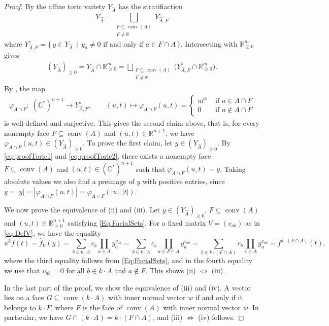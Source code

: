 \documentclass[a4paper,11pt]{amsart}
\theoremstyle{definition}
\DeclareMathOperator{\conv}{conv}
\newcommand{\RR}{\mathbb{R}}
\newcommand{\CC}{\mathbb{C}}
\begin{document}
\begin{proof}
By \cite[Corollary 4.1.3]{TelenBook} the affine toric variety $Y_{\hat{A}}$ has the stratifiaction
\[ Y_{\hat{A}} = \bigsqcup_{\substack{F \subseteq \conv(A)\\ F \neq \emptyset}} Y_{\hat{A},F}^\circ\]
where $Y_{\hat{A},F}^\circ = \{\, y \in Y_{\hat{A}} \, \mid \, y_a \neq 0 \text{ if and only if }  a \in F \cap A\,\}$. Intersecting with $\RR^m_{\geq0}$ gives
\begin{align}
\label{eq:proofToric1}
  ( Y_{\hat{A}})_{\geq 0} =  Y_{\hat{A}} \cap  \RR^m_{\geq0}  = \bigsqcup_{\substack{F \subseteq \conv(A)\\ F \neq \emptyset}} 
 \Big( Y_{\hat{A},F}^\circ  \cap  \RR^m_{\geq0} \big).
 \end{align}
By \cite[Proposition 4.1.5]{TelenBook}, the map
\begin{align}
\label{eq:proofToric2} \varphi_{A \cap F} \colon \; (\CC^*)^{n+1} \to Y_{\hat{A},F}^\circ, \qquad (u,t) \mapsto  \varphi_{A \cap F}(u,t) =  \begin{cases}
    u t^{a} & \text{ if } a \in A\cap F \\
    0  & \text{ if } a \notin A\cap F 
\end{cases} 
\end{align}
is well-defined and surjective. This gives the second claim above, that is, for every nonempty face $F \subseteq \conv(A)$ and $(u,t) \in \RR^{n+1}$, we have $\varphi_{A\cap F}(u,t) \in (Y_{\hat{A}})_{\geq 0}$.
To prove the first claim, let $y \in (Y_{\hat{A}})_{\geq 0}$. By \eqref{eq:proofToric1} and \eqref{eq:proofToric2}, there exists a nonempty face $F\subseteq \conv(A)$ and $(u,t) \in (\CC^*)^{n+1}$ such that $\varphi_{A \cap F} (u,t) = y$. Taking absolute values we also find a preimage of $y$ with positive entries, since  $y = |y| = |\varphi_{A \cap F} (u,t)| = \varphi_{A \cap F} (|u|,|t|)$.

We now prove the equivalence of  (ii) and (iii).
Let $y \in (Y_{\hat{A}})_{\geq 0}, \, F \subseteq \conv(A)$ and $(u,t) \in \RR^{n+1}_{\geq 0}$ satisfying \eqref{Eq:FacialSets}.
For a fixed matrix $V = (v_{ab})$ as in \eqref{eq:DefV}, we have the equality
\[
    u^kf(t) = \hat{f}_V(y) = \sum_{b \in k\cdot A} c_b \prod_{a \in A} y_a^{v_{a b}} = \sum_{ {b \in k\cdot A}} c_b \prod_{a \in F \cap A} y_a^{v_{a b}} = \sum_{b \in k\cdot(F \cap A) } c_b \prod_{a \in A} y_a^{v_{a b}} = f^{k\cdot(F \cap A)}(t),
\]
where the third equality follows from \eqref{Eq:FacialSets}, and in the fourth equality we use that $v_{ab} = 0$ for all $b\in k \cdot A$ and $a \notin F$.
This shows (ii) $\Leftrightarrow$ (iii).

In the last part of the proof, we show the equivalence of (iii) and (iv). A vector lies on a face $G \subseteq\conv(k\cdot A)$ with inner normal vector $w$ if and only if it belongs to $k \cdot F$, where $F$ is the face of $\conv(A)$ with inner normal vector $w$. In particular, we have $G \cap (k \cdot A) = k \cdot (F \cap A)$, and (iii) $\Leftrightarrow$ (iv) follows.
\end{proof}
\end{document}
